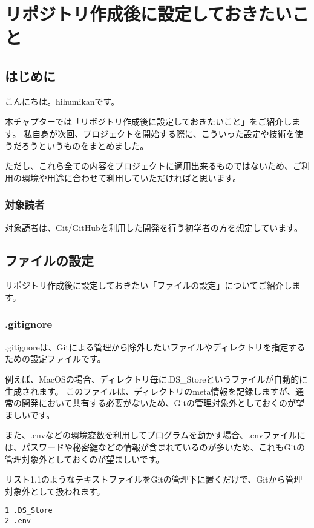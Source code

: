 \chapter{リポジトリ作成後に設定しておきたいこと}
\section{はじめに}
こんにちは。hihumikanです。

本チャプターでは「リポジトリ作成後に設定しておきたいこと」をご紹介します。
私自身が次回、プロジェクトを開始する際に、こういった設定や技術を使うだろうというものをまとめました。

ただし、これら全ての内容をプロジェクトに適用出来るものではないため、ご利用の環境や用途に合わせて利用していただければと思います。

\subsection{対象読者}

対象読者は、Git/GitHubを利用した開発を行う初学者の方を想定しています。

\section{ファイルの設定}

リポジトリ作成後に設定しておきたい「ファイルの設定」についてご紹介します。

\subsection{.gitignore}

.gitignoreは、Gitによる管理から除外したいファイルやディレクトリを指定するための設定ファイルです。

例えば、MacOSの場合、ディレクトリ毎に.DS\_Storeというファイルが自動的に生成されます。
このファイルは、ディレクトリのmeta情報を記録しますが、通常の開発において共有する必要がないため、Gitの管理対象外としておくのが望ましいです。

また、.envなどの環境変数を利用してプログラムを動かす場合、.envファイルには、パスワードや秘密鍵などの情報が含まれているのが多いため、これもGitの管理対象外としておくのが望ましいです。

リスト1.1のようなテキストファイルをGitの管理下に置くだけで、Gitから管理対象外として扱われます。

\begin{tcolorbox}[title=リスト1.1 .gitignore]
  \begin{verbatim}
1 .DS_Store
2 .env
\end{verbatim}
\end{tcolorbox}

